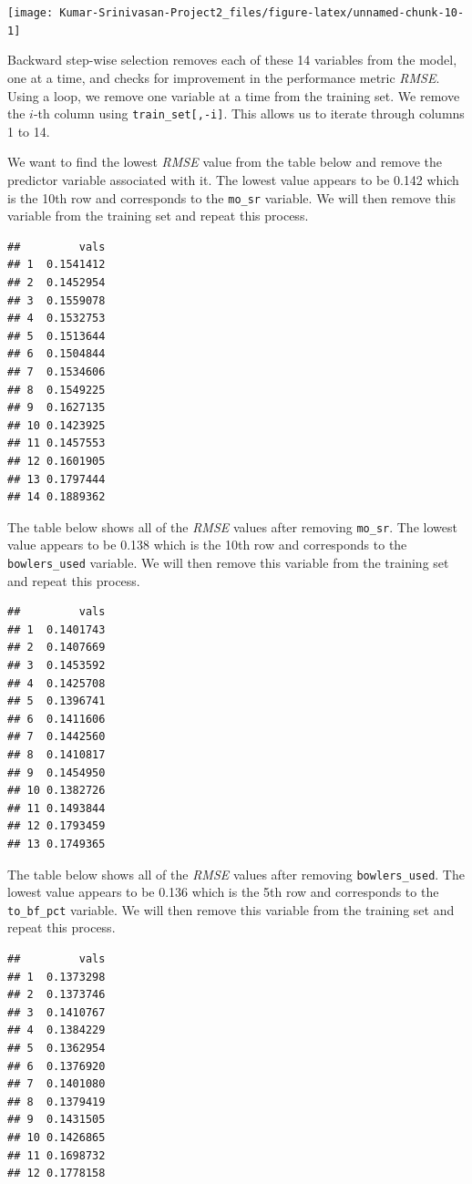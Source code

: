 \documentclass[
]{article}
\begin{document}
\texttt{[image: Kumar-Srinivasan-Project2\_files/figure-latex/unnamed-chunk-10-1]}

Backward step-wise selection removes each of these 14 variables from the
model, one at a time, and checks for improvement in the performance
metric \emph{RMSE}. Using a loop, we remove one variable at a time from
the training set. We remove the \(i\)-th column using
\texttt{train\_set{[},-i{]}}. This allows us to iterate through columns
1 to 14.

We want to find the lowest \emph{RMSE} value from the table below and
remove the predictor variable associated with it. The lowest value
appears to be 0.142 which is the 10th row and corresponds to the
\texttt{mo\_sr} variable. We will then remove this variable from the
training set and repeat this process.

\begin{verbatim}
##         vals
## 1  0.1541412
## 2  0.1452954
## 3  0.1559078
## 4  0.1532753
## 5  0.1513644
## 6  0.1504844
## 7  0.1534606
## 8  0.1549225
## 9  0.1627135
## 10 0.1423925
## 11 0.1457553
## 12 0.1601905
## 13 0.1797444
## 14 0.1889362
\end{verbatim}

The table below shows all of the \emph{RMSE} values after removing
\texttt{mo\_sr}. The lowest value appears to be 0.138 which is the 10th
row and corresponds to the \texttt{bowlers\_used} variable. We will then
remove this variable from the training set and repeat this process.

\begin{verbatim}
##         vals
## 1  0.1401743
## 2  0.1407669
## 3  0.1453592
## 4  0.1425708
## 5  0.1396741
## 6  0.1411606
## 7  0.1442560
## 8  0.1410817
## 9  0.1454950
## 10 0.1382726
## 11 0.1493844
## 12 0.1793459
## 13 0.1749365
\end{verbatim}

The table below shows all of the \emph{RMSE} values after removing
\texttt{bowlers\_used}. The lowest value appears to be 0.136 which is
the 5th row and corresponds to the \texttt{to\_bf\_pct} variable. We
will then remove this variable from the training set and repeat this
process.

\begin{verbatim}
##         vals
## 1  0.1373298
## 2  0.1373746
## 3  0.1410767
## 4  0.1384229
## 5  0.1362954
## 6  0.1376920
## 7  0.1401080
## 8  0.1379419
## 9  0.1431505
## 10 0.1426865
## 11 0.1698732
## 12 0.1778158
\end{verbatim}
\end{document}
